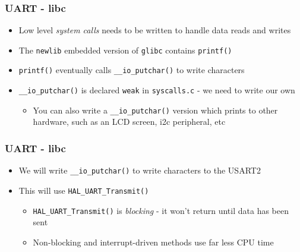 \documentclass[14pt]{beamer}
\begin{document}
\begin{frame}[fragile]
\frametitle{UART - libc}
\begin{itemize}
\item Low level \textit{system calls} needs to be written to handle data reads and writes
\item The \texttt{newlib} embedded version of \texttt{glibc} contains \texttt{printf()}
\item \texttt{printf()} eventually calls \texttt{\_\_io\_putchar()} to write characters
\item \texttt{\_\_io\_putchar()} is declared \texttt{weak} in \texttt{syscalls.c} - we need to write our own
	\begin{itemize}
		\item You can also write a \texttt{\_\_io\_putchar()} version which prints to other hardware, such as an LCD screen, i2c peripheral, etc
	\end{itemize}
\end{itemize}
\end{frame}

\begin{frame}[fragile]
\frametitle{UART - libc}
\begin{itemize}
\item We will write \texttt{\_\_io\_putchar()} to write characters to the USART2
\item This will use \texttt{HAL\_UART\_Transmit()}
	\begin{itemize}
		\item \texttt{HAL\_UART\_Transmit()} is \textit{blocking} - it won't return until data has been sent
		\item Non-blocking and interrupt-driven methods use far less CPU time
	\end{itemize}
\end{itemize}
\end{frame}
\end{document}

